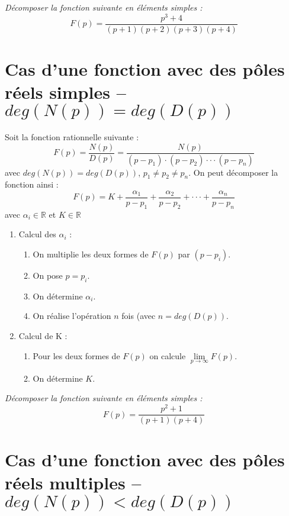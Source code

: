 \documentclass[10pt,fleqn]{article} %
\begin{document}
\begin{exemple}
\textit{Décomposer la fonction suivante en éléments simples :}
$$
F(p)=\dfrac{p^3+4}{(p+1)(p+2)(p+3)(p+4)}
$$
\end{exemple}

\section{Cas d'une fonction avec des pôles réels simples -- $deg(N(p)) = deg(D(p))$}

\begin{resultat}
Soit la fonction rationnelle suivante :
$$
F(p) = \dfrac{N(p)}{D(p)} =\dfrac{N(p)}{(p-p_1)\cdot (p-p_2)\cdot \cdot \cdot (p-p_n)}
$$
avec $deg(N(p)) = deg(D(p))$, $p_1\neq p_2\neq p_n$. On peut décomposer la fonction ainsi :
$$
F(p) = K + \dfrac{\alpha_1}{p-p_1} + \dfrac{\alpha_2}{p-p_2} 
+ \cdot \cdot \cdot + 
\dfrac{\alpha_n}{p-p_n} 
$$
avec $\alpha_i\in \mathbb{R}$ et $K \in \mathbb{R}$
\end{resultat}

\begin{resultat}
\begin{enumerate}
\item Calcul des $\alpha_i$ :
\begin{enumerate}
\item On multiplie les deux formes de $F(p)$ par $(p-p_i)$.
\item On pose $p=p_i$.
\item On détermine $\alpha_i$.
\item On réalise l'opération $n$ fois (avec $n=deg(D(p))$.
\end{enumerate}
\item Calcul de K : 
\begin{enumerate}
\item Pour les deux formes de $F(p)$ on calcule $\lim\limits_{p\to\infty} F(p)$.
\item On détermine $K$.
\end{enumerate}
\end{enumerate}
\end{resultat}

\begin{exemple}
\textit{Décomposer la fonction suivante en éléments simples :}
$$
F(p)=\dfrac{p^2+1}{(p+1)(p+4)}
$$
\end{exemple}


\section{Cas d'une fonction avec des pôles réels multiples -- $deg(N(p)) < deg(D(p))$}
\end{document}
